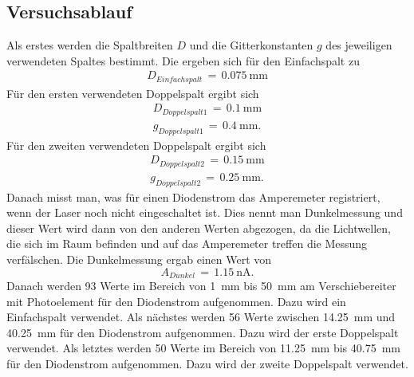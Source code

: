 \documentclass[
  bibliography=totoc,     %
  captions=tableheading,  %
  titlepage=firstiscover, %
]{scrartcl}
\begin{document}
\subsection{Versuchsablauf}
\label{sec:Versuchsablauf}
Als erstes werden die Spaltbreiten $D$ und die Gitterkonstanten $g$ des jeweiligen verwendeten Spaltes bestimmt.
Die ergeben sich für den Einfachspalt zu
\begin{align}
  D_{Einfachspalt}\,=\,\SI{0.075}{\milli\metre}
  \label{eqn:einfachspalt}
\end{align}
Für den ersten verwendeten Doppelspalt ergibt sich
\begin{align}
  D_{Doppelspalt 1}\,=\,\SI{0.1}{\milli\metre}\\
  g_{Doppelspalt 1}\,=\,\SI{0.4}{\milli\metre}.
  \label{eqn:doppelspalt1}
\end{align}
Für den zweiten verwendeten Doppelspalt ergibt sich
\begin{align}
  D_{Doppelspalt 2}\,=\,\SI{0.15}{\milli\metre}\\
  g_{Doppelspalt 2}\,=\,\SI{0.25}{\milli\metre}.
  \label{eqn:doppelspalt2}
\end{align}
Danach misst man, was für einen Diodenstrom das Amperemeter registriert, wenn der Laser noch nicht eingeschaltet ist. Dies nennt man Dunkelmessung und dieser Wert wird dann von den anderen Werten abgezogen, da die Lichtwellen, die sich im Raum befinden und auf das Amperemeter treffen die Messung verfälschen. Die Dunkelmessung ergab einen Wert von
\begin{equation}
  A_{Dunkel}\,=\,\SI{1.15}{\nano\ampere}.
  \label{eqn:dunkel}
\end{equation}
Danach werden 93 Werte im Bereich von \SI{1}{\milli\metre} bis \SI{50}{\milli\metre} am Verschiebereiter mit Photoelement für den Diodenstrom aufgenommen. Dazu wird ein Einfachspalt verwendet.
Als nächstes werden 56 Werte zwischen \SI{14.25}{\milli\metre} und \SI{40.25}{\milli\metre} für den Diodenstrom aufgenommen. Dazu wird der erste Doppelspalt verwendet.
Als letztes werden 50 Werte im Bereich von \SI{11.25}{\milli\metre} bis \SI{40.75}{\milli\metre} für den Diodenstrom aufgenommen. Dazu wird der zweite Doppelspalt verwendet.
\end{document}
